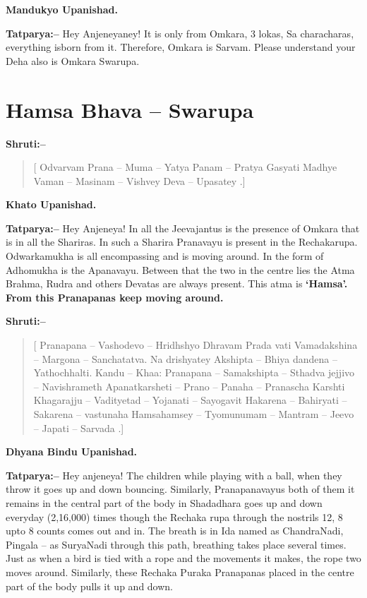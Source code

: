 \begin{flushright}
\textbf{Mandukyo Upanishad.}
\end{flushright}

\textbf{Tatparya:–} Hey Anjeneyaney! It is only from Omkara, 3 lokas, Sa characharas, everything isborn from it. Therefore, Omkara is Sarvam. Please understand your Deha also is Omkara Swarupa.

\chapter{Hamsa Bhava – Swarupa}

\textbf{Shruti:–}

\begin{verse}
[ Odvarvam Prana – Muma – Yatya Panam – Pratya Gasyati  Madhye Vaman – Masinam – Vishvey Deva – Upasatey .]
\end{verse}

\begin{flushright}
\textbf{Khato Upanishad.}
\end{flushright}

\textbf{Tatparya:–} Hey Anjeneya! In all the Jeevajantus is the presence of Omkara that is in all the Shariras. In such a Sharira Pranavayu is present in the Rechakarupa. Odwarkamukha is all encompassing and is moving around. In the form of Adhomukha is the Apanavayu. Between that the two in the centre lies the Atma Brahma, Rudra and others Devatas are always present. This atma is \textbf{‘Hamsa’. From this Pranapanas keep moving around.}

\textbf{Shruti:–}

\begin{verse}
[ Pranapana – Vashodevo – Hridhshyo Dhravam Prada vati  Vamadakshina – Margona – Sanchatatva. Na drishyatey  Akshipta – Bhiya dandena – Yathochhalti. Kandu – Khaa:  Pranapana – Samakshipta – Sthadva jejjivo – Navishrameth  Apanatkarsheti – Prano – Panaha – Pranascha Karshti  Khagarajju – Vadityetad – Yojanati – Sayogavit  Hakarena – Bahiryati – Sakarena – vastunaha  Hamsahamsey – Tyomunumam – Mantram – Jeevo – Japati – Sarvada .]
\end{verse}

\begin{flushright}
\textbf{Dhyana Bindu Upanishad.}
\end{flushright}

\textbf{Tatparya:–} Hey anjeneya! The children while playing with a ball, when they throw it goes up and down bouncing. Similarly, Pranapanavayus both of them it remains in the central part of the body in Shadadhara goes up and down everyday (2,16,000) times though the Rechaka rupa through the nostrils 12, 8 upto 8 counts comes out and in. The breath is in Ida named as ChandraNadi, Pingala – as SuryaNadi through this path, breathing takes place several times. Just as when a bird is tied with a rope and the movements it makes, the rope two moves around. Similarly, these Rechaka Puraka Pranapanas placed in the centre part of the body pulls it up and down.

